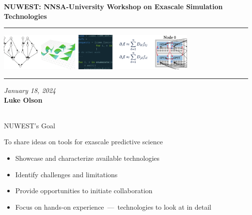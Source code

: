 \documentclass[aspectratio=169]{beamer}
\begin{document}
\begin{frame}\frametitle{}

  \vspace*{0.2in}

  \hspace*{0.0in}\textrm{{\huge\bfseries\color{IllinoisOrange} NUWEST: NNSA-University Workshop on Exascale Simulation Technologies}}

  \vspace*{0.2in}
  \hrule
  \begin{center}
    \includegraphics[width=0.75\textwidth]{./media/coverart-cs.pdf}
  \end{center}
  \hrule

  \vspace*{0.1in}
  \noindent\textit{January 18, 2024}\\
  \vspace*{0.1in}
  \noindent\textbf{\color{IllinoisOrange}Luke Olson}\\
  \\

\end{frame}

\begin{frame}{NUWEST's Goal}
  \begin{center}
    \begin{tcolorbox}[colframe=IllinoisOrange]
      To share ideas on tools for exascale predictive science
    \end{tcolorbox}
  \end{center}
  \begin{itemize}
    \item Showcase and characterize available technologies
    \item Identify challenges and limitations
    \item Provide opportunities to initiate collaboration
    \item Focus on \alert{hands-on experience}~---~technologies to look at in detail
  \end{itemize}
\end{frame}
\end{document}
